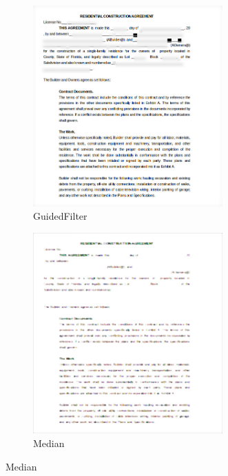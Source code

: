 \documentclass[12pt]{article}
\begin{document}
\begin{figure}
		\begin{subfigure}{0.4\textwidth}
			\centering
			\includegraphics[width=0.8\textwidth]{document/documentjpgGuidedFilter.png}
			\caption{GuidedFilter}
		\end{subfigure}
		\begin{subfigure}{0.4\textwidth}
			\centering
			\includegraphics[width=0.8\textwidth]{document/documentjpgMedianFilter.png}
			\caption{Median}
		\end{subfigure}
		

\end{figure}
\end{document}
